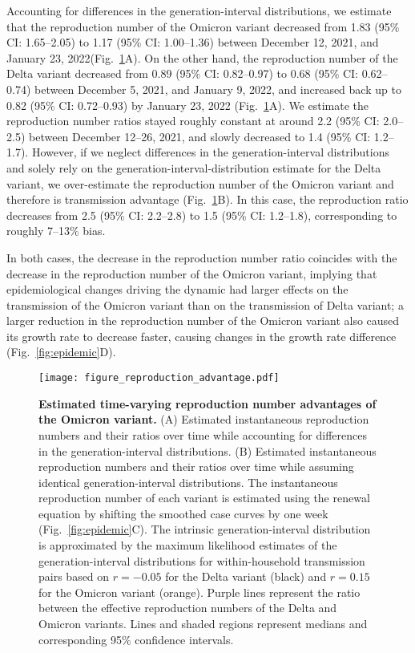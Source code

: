 \documentclass[12pt]{article}
\newcommand{\fref}[1]{Fig.~\ref{fig:#1}}
\begin{document}
Accounting for differences in the generation-interval distributions, we estimate that the reproduction number of the Omicron variant decreased from 1.83 (95\% CI: 1.65--2.05) to 1.17 (95\% CI: 1.00--1.36) between December 12, 2021, and January 23, 2022(\fref{reproduction}A).
On the other hand, the reproduction number of the Delta variant decreased from 0.89 (95\% CI: 0.82--0.97) to 0.68 (95\% CI: 0.62--0.74) between December 5, 2021, and January 9, 2022, and increased back up to 0.82 (95\% CI: 0.72--0.93) by January 23, 2022 (\fref{reproduction}A).
We estimate the reproduction number ratios stayed roughly constant at around 2.2 (95\% CI: 2.0--2.5) between December 12--26, 2021, and slowly decreased to 1.4 (95\% CI: 1.2--1.7).
However, if we neglect differences in the generation-interval distributions and solely rely on the generation-interval-distribution estimate for the Delta variant, we over-estimate the reproduction number of the Omicron variant and therefore is transmission advantage (\fref{reproduction}B).
In this case, the reproduction ratio decreases from 2.5 (95\% CI: 2.2--2.8) to 1.5 (95\% CI: 1.2--1.8), corresponding to roughly 7--13\% bias.

In both cases, the decrease in the reproduction number ratio coincides with the decrease in the reproduction number of the Omicron variant, implying that epidemiological changes driving the dynamic had larger effects on the transmission of the Omicron variant than on the transmission of Delta variant;
a larger reduction in the reproduction number of the Omicron variant also caused its growth rate to decrease faster, causing changes in the growth rate difference (\fref{epidemic}D).


\begin{figure}[!th]
\texttt{[image: figure\_reproduction\_advantage.pdf]}
\caption{
\textbf{Estimated time-varying reproduction number advantages of the Omicron variant.}
(A) Estimated instantaneous reproduction numbers and their ratios over time while accounting for differences in the generation-interval distributions.
(B) Estimated instantaneous reproduction numbers and their ratios over time while assuming identical generation-interval distributions.
The instantaneous reproduction number of each variant is estimated using the renewal equation by shifting the smoothed case curves by one week (\fref{epidemic}C).
The intrinsic generation-interval distribution is approximated by the maximum likelihood estimates of the generation-interval distributions for within-household transmission pairs based on $r=-0.05$ for the Delta variant (black) and $r=0.15$ for the Omicron variant (orange).
Purple lines represent the ratio between the effective reproduction numbers of the Delta and Omicron variants.
Lines and shaded regions represent medians and corresponding 95\% confidence intervals.
\label{fig:reproduction}
}
\end{figure}
\end{document}
